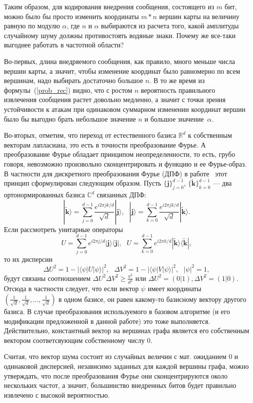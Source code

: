Таким образом, для кодирования внедрения сообщения, состоящего из $m$ бит, можно было бы просто изменить координаты $m * n$ вершин карты на величину равную по модулю $\alpha$, где
$n$ и $\alpha$ выбираются из расчета того, какой амплитуды случайному шуму должны противостоять водяные знаки. Почему же все-таки выгоднее работать в частотной области?

Во-первых, длина внедряемого сообщения, как правило, много меньше числа вершин карты, а значит, чтобы изменение координат было равномерно 
по всем вершинам, надо выбирать достаточно большое $n$. В то же время из формулы~(\ref{prob_rec}) видно, что с ростом $n$ вероятность 
правильного извлечения сообщения растет довольно медленно, а значит с точки зрения устойчивости к атакам при одинаковом 
суммарном изменении координат вершин было бы выгодно брать небольшое значение $n$ и большое значение~$\alpha$.

Во-вторых, отметим, что переход от естественного базиса $\mathbb{R}^d$ к собственным векторам лапласиана, это есть в точности преобразование Фурье. 
А преобразование Фурье обладает принципом неопределенности, то есть, грубо говоря, невозможно произвольно сконцентрировать и функцию и ее Фурье-образ.
В частности для дискретного преобразования Фурье (ДПФ) в работе~\cite{Uncertainty} этот принцип сформулирован следующим образом. 
Пусть $\{\mathbf{j}\}_{j=0}^{d-1}$, $\{\tilde{\mathbf{k}}\}_{k=0}^{d-1}$ --- два ортонормированных базиса $\mathbb{C}^d$ связанных ДПФ:
\begin{equation*}
\textstyle |\tilde{\mathbf{k}} \rangle = \sum\limits_{j=0}^{d-1} \frac{e^{i 2\pi j k / d}}{\sqrt{d}} |\mathbf{j} \rangle,\mbox{    }
|{\mathbf{j}} \rangle = \sum\limits_{k=0}^{d-1} \frac{e^{i 2\pi j k / d}}{\sqrt{d}} |\tilde{\mathbf{k}} \rangle.
\end{equation*}
Если рассмотреть унитарные операторы 
$$
U = \sum\limits_{j=0}^{d-1} e^{i 2\pi j / d} |\mathbf{j} \rangle \langle \mathbf{j} |,\mbox{    }
U = \sum\limits_{k=0}^{d-1} e^{i 2\pi k / d} |\tilde{\mathbf{k}} \rangle \langle \tilde{\mathbf{k}} |,
$$
то их дисперсии
$$
\textstyle
\Delta U^2 = 1 - |\langle \psi | U | \psi \rangle |^2, \mbox{   }
\Delta V^2 = 1 - |\langle \psi | V | \psi \rangle |^2, \mbox{   } |\psi|^2 = 1,
$$
будут связаны соотношением $\Delta U^2 \Delta V^2 \ge \frac{\pi^2}{d^2}$ или $\Delta U^2 = (0|1), \Delta V^2 = (1|0)$. Отсюда в частности следует, что если вектор $\psi$ имеет координаты 
$\left(\frac{1}{\sqrt{d}}, \frac{1}{\sqrt{d}}, \ldots, \frac{1}{\sqrt{d}}\right)$ в одном базисе, он равен какому-то базисному вектору другого базиса.
В случае преобразования используемого в базовом алгоритме (и его модификации предложенной в данной работе) это тоже выполняется. Действительно, константный вектор на вершинах графа 
является его собственным вектором соответсвующим собственному числу $0$.

Считая, что вектор шума состоит из случайных величин с мат. ожиданием $0$ и одинаковой дисперсией, независимо заданных для каждой вершины графа, можно утверждать, 
что после преобразования Фурье они сконцентрируются около нескольких частот, а значит, большинство внедренных битов будет правильно извлечено с высокой вероятностью.
